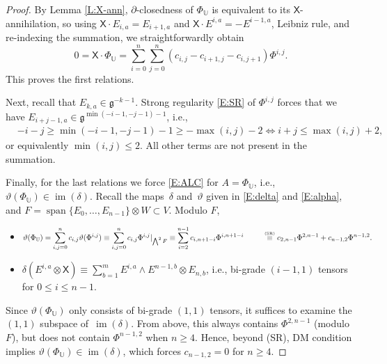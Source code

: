 \documentclass[10pt,a4paper]{amsart}
\newcommand\tensor{\otimes}
\DeclareMathOperator{\img}{im}
\DeclareMathOperator{\sn}{span}
\newcommand\fg{\mathfrak{g}}
\newcommand\bbU{\mathbb{U}}
\newcommand\sfX{\mathsf{X}}
\numberwithin{equation}{section}
\begin{document}
\begin{proof}
 By Lemma \ref{L:X-ann}, $\partial$-closedness of $\Phi_\bbU$ is equivalent to its $\sfX$-annihilation, so using $\sfX \cdot E_{i,a} = E_{i+1,a}$ and $\sfX \cdot E^{i,a} = -E^{i-1,a}$, Leibniz rule, and re-indexing the summation, we straightforwardly obtain{\samepage
\[
0 = \sfX \cdot \Phi_{\bbU} = \sum_{i=0}^n \sum_{j=0}^n (c_{i,j}- c_{i+1,j} - c_{i,j+1})\Phi^{i,j}.
\]
This proves the first relations.}

Next, recall that $E_{k,a} \in \fg^{-k-1}$. Strong regularity \eqref{E:SR} of $\Phi^{i,j}$ forces that we have $E_{i+j-1,a} \in \fg^{\min(-i-1,-j-1)-1}$, i.e.,
\begin{align*}
&-i-j \ge \min( -i-1,-j-1)-1 \ge -\max(i,j)-2 \iff i+j \le \max(i,j)+2,
\end{align*}
or equivalently $\min(i,j) \leq 2$. All other terms are not present in the summation.

Finally, for the last relations we force \eqref{E:ALC} for $A=\Phi_\bbU$, i.e., $\vartheta(\Phi_\bbU) \in \img(\delta)$. Recall the maps~$\delta$ and~$\vartheta$ given in \eqref{E:delta} and \eqref{E:alpha}, and $F=\sn \{E_0,\dots,E_{n-1}\}\tensor W \subset V$. Modulo $F$,
 \begin{itemize}\itemsep=0pt
 \item $\displaystyle \vartheta(\Phi_\bbU) = \sum_{i,j=0}^n c_{i,j}\vartheta(\Phi^{i,j}) \equiv \sum_{i,j=0}^n c_{i,j}\Phi^{i,j}|_{\bigwedge^2F} \equiv \sum_{i=2}^{n-1} c_{i,n+1-i}\Phi^{i, n+1-i} \\ \hphantom{\vartheta(\Phi_\bbU\!)}\overset{\text{\tiny (SR)}}{\equiv} c_{2,n-1}\Phi^{2, n-1} + c_{n-1,2}\Phi^{n-1,2}.$
 \item $ \displaystyle \delta(E^{i,a} \tensor \sfX) \equiv \sum_{b=1}^m E^{i,a} \wedge E^{n-1,b} \tensor E_{n,b}$, i.e., bi-grade $(i-1,1)$ tensors for $0 \le i \le n-1$.
 \end{itemize}
 Since $\vartheta(\Phi_\bbU)$ only consists of bi-grade $(1,1)$ tensors, it suffices to examine the $(1,1)$ subspace of~$\img(\delta)$. From above, this always contains $\Phi^{2,n-1}$ (modulo $F$), but does not contain $\Phi^{n-1,2}$ when $n \geq 4$. Hence, beyond (SR), DM condition implies $\vartheta(\Phi_{\bbU}) \in \img(\delta)$, which forces $c_{n-1,2} = 0$ for $n \ge 4$.
\end{proof}
\end{document}
